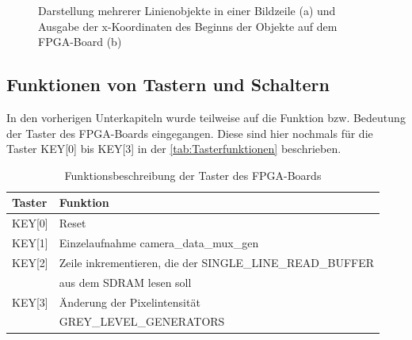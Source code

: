 \documentclass[ngerman,12pt]{article} %
\begin{document}
{\begin{figure}[h!tb]
  \centering
  \qquad
  \caption[Darstellung mehrerer Linienobjekte in einer Bildzeile und die Ausgabe der x-Koordinate auf dem FPGA-Board]{\label{pic:Linienobjekte}Darstellung mehrerer Linienobjekte in einer Bildzeile (a) und Ausgabe der x-Koordinaten des Beginns der Objekte auf dem FPGA-Board (b)}
\end{figure}



\subsection{Funktionen von Tastern und Schaltern}
\label{sec:Funktionen von Schalter und Tastern}
In den vorherigen Unterkapiteln wurde teilweise auf die Funktion bzw. Bedeutung der Taster des FPGA-Boards eingegangen. Diese sind hier nochmals für die Taster  KEY[0] bis KEY[3] in der \autoref{tab:Tasterfunktionen} beschrieben.\newline

\begin{table}[h!tb]
\begin{center}
\caption[Funktionsbeschreibung der Taster des FPGA-Boards]{\label{tab:Tasterfunktionen}Funktionsbeschreibung der Taster des FPGA-Boards}
\begin{tabularx}{\textwidth}{|l|X|}
\hline
Taster &Funktion\\
\hline
KEY[0]&Reset\\
\hline
KEY[1]&Einzelaufnahme camera\_data\_mux\_gen\\
\hline
KEY[2]&Zeile inkrementieren, die der SINGLE\_LINE\_READ\_BUFFER \\ &aus dem SDRAM lesen soll\\
\hline
KEY[3]&Änderung der Pixelintensität \\&GREY\_LEVEL\_GENERATORS\\
\hline
\end{tabularx}
\end{center}
\end{table}

}
\end{document}
